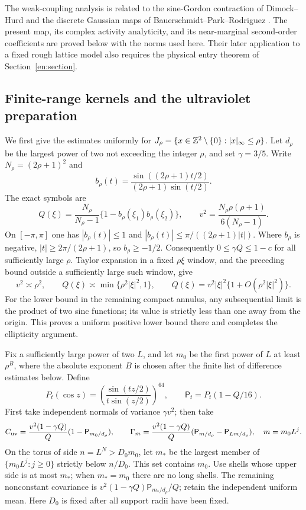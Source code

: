 The weak-coupling analysis is related to the sine-Gordon contraction
of Dimock--Hurd \citep{DimockHurd2000} and the discrete Gaussian maps
of Bauerschmidt--Park--Rodriguez \citep{BPR2024I}.
The present map, its complex activity analyticity, and its near-marginal
second-order coefficients are proved below with the norms used here.
Their later application to a fixed rough lattice model also requires
the physical entry theorem of Section~\ref{en:section}.

\subsection{Finite-range kernels and the ultraviolet preparation}

We first give the estimates uniformly for
$J_\rho=\{x\in\mathbb Z^2\setminus\{0\}:|x|_\infty\le\rho\}$.
Let $d_\rho$ be the largest power of two not exceeding the integer $\rho$,
and set $\gamma=3/5$.  Write $N_\rho=(2\rho+1)^2$ and
\[
 b_\rho(t)=\frac{\sin((2\rho+1)t/2)}{(2\rho+1)\sin(t/2)}.
\]
The exact symbols are
\begin{equation}\label{wh:spread-symbol}
 Q(\xi)=\frac{N_\rho}{N_\rho-1}
          \{1-b_\rho(\xi_1)b_\rho(\xi_2)\},\qquad
 v^2=\frac{N_\rho\rho(\rho+1)}{6(N_\rho-1)}.
\end{equation}
On $[-\pi,\pi]$ one has $|b_\rho(t)|\le1$ and
$|b_\rho(t)|\le\pi/((2\rho+1)|t|)$.  Where $b_\rho$ is negative,
$|t|\ge2\pi/(2\rho+1)$, so $b_\rho\ge-1/2$.
Consequently $0\le\gamma Q\le1-c$ for all sufficiently large $\rho$.
Taylor expansion in a fixed $\rho\xi$ window, and the preceding bound
outside a sufficiently large such window, give
\begin{equation}\label{wh:ellipticity}
 v^2\asymp\rho^2,\qquad
 Q(\xi)\asymp\min\{\rho^2|\xi|^2,1\},\qquad
 Q(\xi)=v^2|\xi|^2\{1+O(\rho^2|\xi|^2)\}.
\end{equation}
For the lower bound in the remaining compact annulus, any subsequential
limit is the product of two sinc functions; its value is strictly less
than one away from the origin.  This proves a uniform positive lower
bound there and completes the ellipticity argument.

Fix a sufficiently large power of two $L$, and let $m_0$ be the first
power of $L$ at least $\rho^B$, where the absolute exponent $B$ is chosen
after the finite list of difference estimates below.  Define
\[
 P_t(\cos z)=\left(\frac{\sin(tz/2)}{t\sin(z/2)}\right)^{64},
 \qquad \mathsf P_t=P_t(1-Q/16).
\]
First take independent normals of variance $\gamma v^2$; then take
\begin{equation}\label{wh:covariances}
 C_{\rm uv}=\frac{v^2(1-\gamma Q)}{Q}(1-\mathsf P_{m_0/d_\rho}),
 \qquad
 \Gamma_m=\frac{v^2(1-\gamma Q)}{Q}
       (\mathsf P_{m/d_\rho}-\mathsf P_{Lm/d_\rho}),
 \quad m=m_0L^j.
\end{equation}
On the torus of side $n=L^N>D_0m_0$, let $m_*$ be the largest member
of $\{m_0L^j:j\ge0\}$ strictly below $n/D_0$.  This set contains
$m_0$.  Use shells whose upper side is at most $m_*$; when
$m_*=m_0$ there are no long shells.  The remaining
nonconstant covariance is
$v^2(1-\gamma Q)\mathsf P_{m_*/d_\rho}/Q$; retain the independent
uniform mean.  Here $D_0$ is fixed after all support radii have been fixed.

